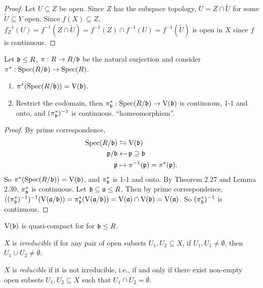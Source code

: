 \begin{proof}
    Let $U \subseteq Z$ be open. Since $Z$ has the subspace topology, $U = Z \cap \widetilde U$ for some $\widetilde U \subseteq Y$ open. Since $f(X) \subseteq Z$, $f_Z^{-1}(U) = f^{-1}(Z \cap \widetilde U) = f^{-1}(Z) \cap f^{-1}(U) = f^{-1}(\widetilde U)$ is open in $X$ since $f$ is continuous.
\end{proof}

\begin{theorem}
    Let $\mathfrak{b} \leq R$, $\pi: R \to R/\mathfrak{b}$ be the natural surjection and consider $\pi^*: \operatorname{Spec}(R/\mathfrak{b}) \to \operatorname{Spec}(R)$.
    \begin{enumerate}
        \item $\pi^*(\operatorname{Spec}(R/\mathfrak{b})) = \operatorname{V}(\mathfrak{b})$.
        \item Restrict the codomain, then $\pi_{\mathfrak{b}}^*: \operatorname{Spec}(R/\mathfrak{b}) \to \operatorname{V}(\mathfrak{b})$ is continuous, 1-1 and onto, and $(\pi_{\mathfrak{b}}^*)^{-1}$ is continuous. ``homeomorphism''.
    \end{enumerate}
\end{theorem}

\begin{proof}
    By prime correspondence, 
    \begin{align*}
        \operatorname{Spec}(R/\mathfrak{b}) &\leftrightarrows \operatorname{V}(\mathfrak{b}) \\
        \mathfrak{p}/\mathfrak{b} &\mapsfrom \mathfrak{p} \supseteq \mathfrak{b} \\
        \mathfrak{p} &\mapsto \pi^{-1}(\mathfrak{p}) = \pi^*(\mathfrak{p}).
    \end{align*}
    So $\pi^*(\operatorname{Spec}(R/\mathfrak{b})) = \operatorname{V}(\mathfrak{b})$, and $\pi_{\mathfrak{b}}^*$ is 1-1 and onto. By Theorem 2.27 and Lemma 2.30, $\pi_{\mathfrak{b}}^*$ is continuous. Let $\mathfrak{b} \subseteq \mathfrak{a} \leq R$. Then by prime correspondence, $((\pi_{\mathfrak{b}}^*)^{-1})^{-1}(\operatorname{V}(\mathfrak{a}/\mathfrak{b})) = \pi_{\mathfrak{b}}^*(\operatorname{V}(\mathfrak{a}/\mathfrak{b})) = \operatorname{V}(\mathfrak{a}) \cap \operatorname{V}(\mathfrak{b}) = \operatorname{V}(\mathfrak{a})$. So $(\pi_{\mathfrak{b}}^*)^{-1}$ is continuous.
\end{proof}

\begin{corollary}
    $\operatorname{V}(\mathfrak{b})$ is quasi-compact for for $\mathfrak{b} \leq R$.
\end{corollary}

\begin{definition}
    $X$ is \emph{irreducible} if for any pair of open subsets $U_1,U_2 \subseteq X$, if $U_1,U_1 \neq \emptyset$, then $U_1 \cup U_2 \neq \emptyset$. \par 
    $X$ is \emph{reducible} if it is not irreducible, i.e., if and only if there exist non-empty open subsets $U_1,U_2 \subseteq X$ such that $U_1 \cap U_2 = \emptyset$.
\end{definition}

